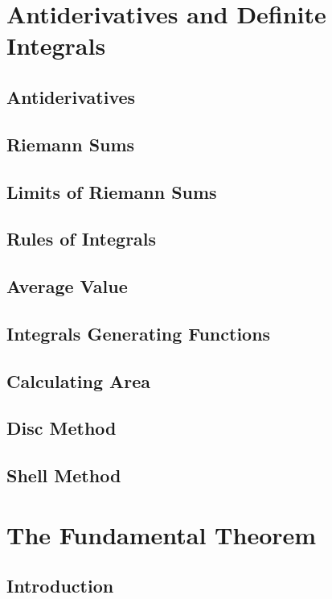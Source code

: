 \documentclass{article}
\begin{document}
\section{Antiderivatives and Definite Integrals}
\subsection{Antiderivatives}
\subsection{Riemann Sums}
\subsection{Limits of Riemann Sums}
\subsection{Rules of Integrals}
\subsection{Average Value}
\subsection{Integrals Generating Functions}
\subsection{Calculating Area}
\subsection{Disc Method}
\subsection{Shell Method}
\newpage
\section{The Fundamental Theorem}
\subsection{Introduction}
\end{document}

